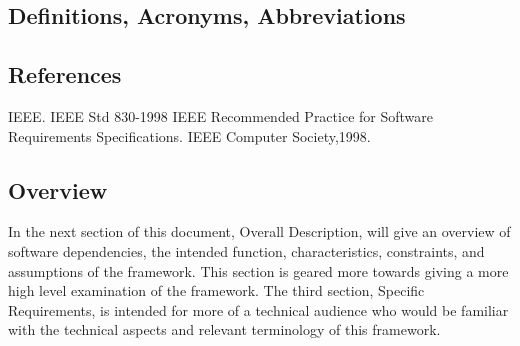 \documentclass[draftclsnofoot, onecolumn, compsoc, 10pt]{IEEEtran}
\begin{document}
\subsection{Definitions, Acronyms, Abbreviations}
\bgroup
\def\arraystretch{1.5}
\egroup

\subsection{References}
IEEE. IEEE Std 830-1998 IEEE Recommended Practice for Software Requirements Specifications. IEEE Computer Society,1998.

\subsection{Overview}
In the next section of this document, Overall Description, will give an overview of software dependencies, the intended function, characteristics, constraints, and assumptions of the framework. This section is geared more towards giving a more high level examination of the framework. The third section, Specific Requirements, is intended for more of a technical audience who would be familiar with the technical aspects and relevant terminology of this framework. 
\end{document}
